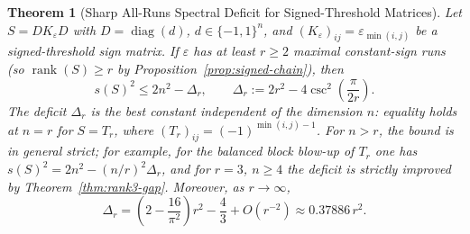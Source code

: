 \documentclass[11pt,reqno]{article}
\newtheorem{theorem}{Theorem}[section]
\theoremstyle{definition}
\newcommand{\diag}{\operatorname{diag}}
\newcommand{\rank}{\operatorname{rank}}
\begin{document}
\begin{theorem}[Sharp All-Runs Spectral Deficit for Signed-Threshold Matrices]\label{thm:all-runs-gap}
Let $S = D K_\varepsilon D$ with $D = \diag(d)$, $d \in \{-1, 1\}^n$, and $(K_\varepsilon)_{ij} = \varepsilon_{\min(i, j)}$ be a signed-threshold sign matrix. If $\varepsilon$ has at least $r \ge 2$ maximal constant-sign runs (so $\rank(S) \ge r$ by Proposition~\ref{prop:signed-chain}), then
\begin{equation}\label{eq:all-runs-gap}
s(S)^2 \le 2n^2 - \Delta_r, \qquad \Delta_r := 2r^2 - 4\csc^2\left(\frac{\pi}{2r}\right).
\end{equation}
The deficit $\Delta_r$ is the best constant independent of the dimension $n$: equality holds at $n = r$ for $S = T_r$, where $(T_r)_{ij} = (-1)^{\min(i, j) - 1}$. For $n > r$, the bound is in general strict; for example, for the balanced block blow-up of $T_r$ one has $s(S)^2 = 2n^2 - (n/r)^2 \Delta_r$, and for $r=3$, $n \ge 4$ the deficit is strictly improved by Theorem~\ref{thm:rank3-gap}. Moreover, as $r \to \infty$,
\begin{equation}
\Delta_r = \left(2 - \frac{16}{\pi^2}\right)r^2 - \frac{4}{3} + O(r^{-2}) \approx 0.37886\, r^2.
\end{equation}
\end{theorem}
\end{document}
